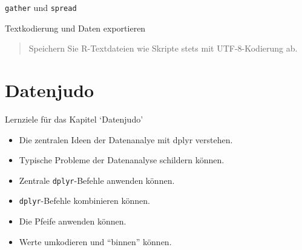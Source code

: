 \begin{frame}[fragile]{\texttt{gather} und \texttt{spread}}

\begin{Shaded}
\begin{Highlighting}[]
\StringTok{ } \NormalTok{, } \NormalTok{)}

\StringTok{ }

\StringTok{ } \NormalTok{, } \NormalTok{, }\OperatorTok{-}
\end{Highlighting}
\end{Shaded}

\end{frame}

\begin{frame}[fragile]{Textkodierung und Daten exportieren}

\begin{quote}
Speichern Sie R-Textdateien wie Skripte stets mit UTF-8-Kodierung ab.
\end{quote}

\begin{Shaded}
\begin{Highlighting}[]
\NormalTok{)}
\end{Highlighting}
\end{Shaded}

\end{frame}

\section{Datenjudo}\label{datenjudo}

\begin{frame}[fragile]{Lernziele für das Kapitel `Datenjudo'}

\begin{itemize}
\tightlist
\item
  Die zentralen Ideen der Datenanalye mit dplyr verstehen.
\item
  Typische Probleme der Datenanalyse schildern können.
\item
  Zentrale \texttt{dplyr}-Befehle anwenden können.
\item
  \texttt{dplyr}-Befehle kombinieren können.
\item
  Die Pfeife anwenden können.
\item
  Werte umkodieren und ``binnen'' können.
\end{itemize}

\end{frame}

